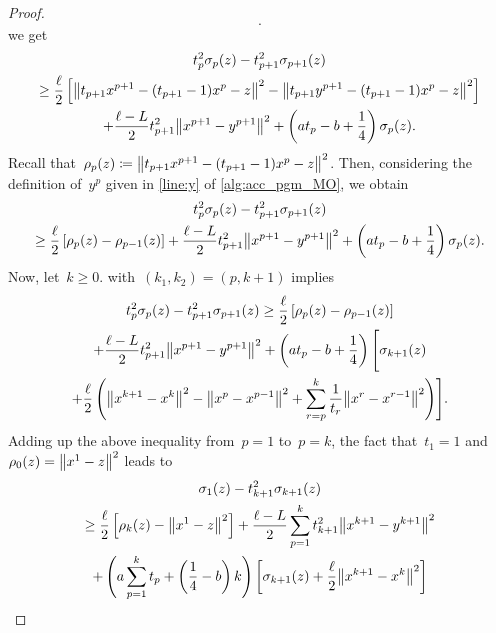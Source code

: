 \documentclass[../main]{subfiles}
\begin{document}
\begin{proof}
\[    .\]
    we get
    \begin{multline}
        t_p^2 \sigma_p(z) - t_{p + 1}^2 \sigma_{p + 1}(z) \\
        \ge \frac{\ell}{2} \left[ \norm*{t_{p + 1} x^{p + 1} - (t_{p + 1} - 1) x^p - z}^2 - \norm*{t_{p + 1} y^{p + 1} - (t_{p + 1} - 1) x^p - z}^2 \right] \\
        + \frac{\ell - L}{2} t_{p + 1}^2 \norm*{x^{p + 1} - y^{p + 1}}^2 + \left( a t_p - b + \frac{1}{4} \right) \sigma_p(z)
    .\end{multline}
    Recall that~$\rho_p(z) \coloneqq \norm*{t_{p + 1} x^{p + 1} - (t_{p + 1} - 1) x^p - z}^2$.
    Then, considering the definition of~$y^p$ given in \cref{line:y} of \cref{alg:acc_pgm_MO}, we obtain
    \begin{multline}
        t_p^2 \sigma_p(z) - t_{p + 1}^2 \sigma_{p + 1}(z) \\
        \ge \frac{\ell}{2} \left[ \rho_p(z) - \rho_{p - 1}(z) \right] + \frac{\ell - L}{2} t_{p + 1}^2 \norm*{x^{p + 1} - y^{p + 1}}^2 + \left( a t_p - b + \frac{1}{4} \right) \sigma_p(z)
    .\end{multline}
    Now, let~$k \ge 0$.
     with~$(k_1, k_2) = (p, k + 1)$ implies
    \begin{multline}
        t_p^2 \sigma_p(z) - t_{p + 1}^2 \sigma_{p + 1}(z) \ge \frac{\ell}{2} \left[ \rho_p(z) - \rho_{p - 1}(z) \right] \\
        + \frac{\ell - L}{2} t_{p + 1}^2 \norm*{x^{p + 1} - y^{p + 1}}^2 + \left( a t_p - b + \frac{1}{4} \right) \Biggl[ \sigma_{k + 1}(z) \\
        + \frac{\ell}{2} \left( \norm*{x^{k + 1} - x^k}^2 - \norm*{x^p - x^{p - 1}}^2 + \sum_{r = p}^k \frac{1}{t_r} \norm*{x^r - x^{r - 1}}^2 \right) \Biggr]
    .\end{multline}
    Adding up the above inequality from~$p = 1$ to~$p = k$, the fact that~$t_1 = 1$ and~$\rho_0(z) = \norm*{x^1 - z}^2$ leads to
    \begin{multline} \label{eq:key relation tmp}
        \sigma_1(z) - t_{k + 1}^2 \sigma_{k + 1}(z) \\
        \ge \frac{\ell}{2} \left[ \rho_{k}(z) - \norm*{x^1 - z}^2 \right] + \frac{\ell - L}{2} \sum_{p = 1}^k t_{k + 1}^2 \norm*{x^{k + 1} - y^{k + 1}}^2 \\
        + \left( a \sum_{p = 1}^{k} t_p + \left( \frac{1}{4} - b \right) k \right) \left[ \sigma_{k + 1}(z) + \frac{\ell}{2} \norm*{x^{k + 1} - x^k}^2 \right] \\

\end{multline}
\end{proof}
\end{document}
